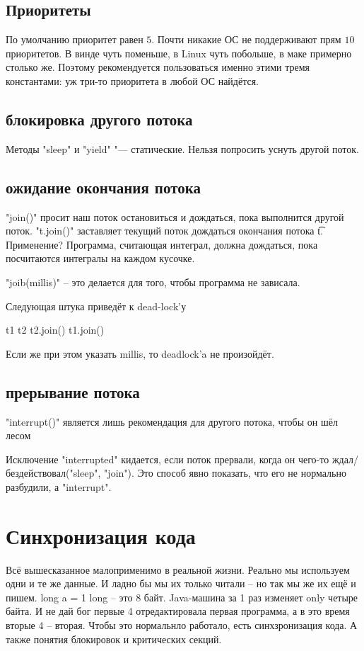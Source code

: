 \section{Приоритеты}
По умолчанию приоритет равен $5$.
Почти никакие ОС не поддерживают прям $10$ приоритетов. В винде чуть поменьше, в Linux чуть побольше, в маке примерно столько же.
Поэтому рекомендуется пользоваться именно этими тремя константами: уж три-то приоритета в любой ОС найдётся.%

\section{блокировка другого потока}
Методы \java"sleep" и \java"yield" "--- статические.
Нельзя попросить уснуть другой поток.

\section{ожидание окончания потока}
\java"join()" просит наш поток остановиться и дождаться, пока выполнится другой поток. 
\java"t.join()" заставляет текущий поток дождаться окончания потока \t{t}. Применение? Программа, считающая интеграл, должна дождаться,
пока посчитаются интегралы на каждом кусочке.

\java"joib(millis)" -- это делается для того, чтобы программа не зависала.

Следующая штука приведёт к dead-lock'у

t1			t2
t2.join()		t1.join()

Если же при этом указать millis, то deadlock'a не произойдёт.

\section{прерывание потока}
\java"interrupt()" является лишь рекомендация для другого потока, чтобы он шёл лесом

Исключение \java"interrupted" кидается, если поток прервали, когда он чего-то ждал/бездействовал(\java"sleep", \java"join").
Это способ явно показать, что его не нормально разбудили, а \java"interrupt".


\chapter{Синхронизация кода}
Всё вышесказанное малоприменимо в реальной жизни. Реально мы используем одни и те же данные. И ладно бы мы их только читали --
но так мы же их ещё и пишем.
long a = 1
long -- это 8 байт. Java-машина за 1 раз изменяет only четыре байта. И не дай бог первые 4 отредактировала первая программа,
а в это время вторые 4 -- вторая.
Чтобы это нормальнло работало, есть синхзронизация кода. А также понятия блокировок и критических секций.

